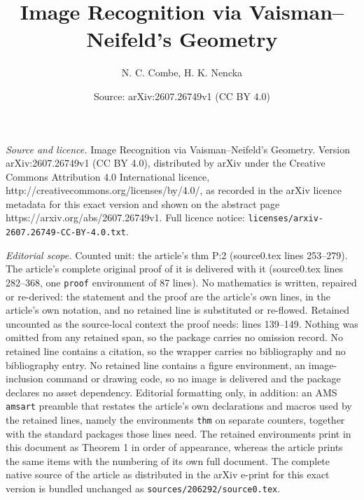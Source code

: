 \documentclass[10pt,a4paper]{amsart}
\title{Image Recognition via Vaisman--Neifeld's Geometry}
\author{N. C. Combe, H. K. Nencka}
\date{Source: arXiv:2607.26749v1 (CC BY 4.0)}
\begin{document}
\maketitle

\noindent\emph{Source and licence.} Image Recognition via Vaisman--Neifeld's Geometry. Version arXiv:2607.26749v1 (CC BY 4.0), distributed by arXiv under the Creative Commons Attribution 4.0 International licence, http://creativecommons.org/licenses/by/4.0/, as recorded in the arXiv licence metadata for this exact version and shown on the abstract page https://arxiv.org/abs/2607.26749v1. Full licence notice: \texttt{licenses/arxiv-2607.26749-CC-BY-4.0.txt}.\par\smallskip

\noindent\textit{Editorial scope.} Counted unit: the article's thm P:2 (source0.tex lines 253--279). The article's complete original proof of it is delivered with it (source0.tex lines 282--368, one \texttt{proof} environment of 87 lines). No mathematics is written, repaired or re-derived: the statement and the proof are the article's own lines, in the article's own notation, and no retained line is substituted or re-flowed.  Retained uncounted as the source-local context the proof needs: lines 139--149.  Nothing was omitted from any retained span, so the package carries no omission record.  No retained line contains a citation, so the wrapper carries no bibliography and no bibliography entry.  No retained line contains a figure environment, an image-inclusion command or drawing code, so no image is delivered and the package declares no asset dependency.  Editorial formatting only, in addition: an AMS \texttt{amsart} preamble that restates the article's own declarations and macros used by the retained lines, namely the environments \texttt{thm} on separate counters, together with the standard packages those lines need.  The retained environments print in this document as Theorem 1 in order of appearance, whereas the article prints the same items with the numbering of its own full document.  The complete native source of the article as distributed in the arXiv e-print for this exact version is bundled unchanged as \texttt{sources/206292/source0.tex}.
\end{document}
